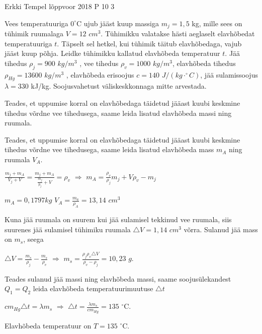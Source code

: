 {Erkki Tempel} %
{lõppvoor} %
{2018} %
{P 10} %
{3} %
{

\ifStatement
Vees temperatuuriga $0^{\circ}$C ujub jääst kuup massiga $m_j = 1,5$ kg, mille sees on tühimik ruumalaga $V = 12$ $cm^3$. Tühimikku valatakse hästi aeglaselt elavhõbedat temperatuuriga $t$. Täpselt sel hetkel, kui tühimik täitub elavhõbedaga, vajub jääst kuup põhja. Leidke tühimikku kallatud elavhõbeda temperatuur $t$. Jää tihedus $\rho_j = 900$ $kg/m^3$ , vee tihedus $\rho_v = 1000$ $kg/m^3$, elavhõbeda tihedus $\rho_{Hg} = 13 600$ $kg/m^3$ , elavhõbeda erisoojus $c = 140$ $J/(kg\cdot ^{\circ}C)$, jää sulamissoojus $\lambda = 330$ kJ/kg. Soojusvahetust väliskeskkonnaga mitte arvestada.
\fi

\ifHint
Teades, et uppumise korral on elavhõbedaga täidetud jääast kuubi keskmine tihedus võrdne vee tihedusega, saame leida lisatud elavhõbeda massi ning ruumala.
\fi

\ifSolution
Teades, et uppumise korral on elavhõbedaga täidetud jääast kuubi keskmine tihedus võrdne vee tihedusega, saame leida lisatud elavhõbeda mass $m_A$ ning ruumala $V_A$.
\begin{center}
$\frac{m_j + m_A}{V_j + V} = \frac{m_j + m_A}{\frac{m_j}{p_j} + V} = \rho_v$ $\Rightarrow$ $m_A = \frac{\rho_v}{\rho_j} m_j + V \rho_v - m_j$
\end{center}
\begin{center}
$m_A = 0,1797 kg$ 
$V_A = \frac{m_a}{\rho_A} = 13,14$ $cm^3$
\end{center}
Kuna jää ruumala on suurem kui jää sulamisel tekkinud vee ruumala, siis suurenes jää sulamisel tühimiku ruumala $\triangle V = 1,14$ $cm^3$ võrra. Sulanud jää mass on $m_s$, seega
\begin{center}
$\triangle V = \frac{m_s}{\rho_j} - \frac{m_s}{\rho_v}$ $\Rightarrow$ $m_s = \frac{\rho_j \rho_v \triangle V}{\rho_v - \rho_j} = 10,23$ $g$.
\end{center}
Teades sulanud jää massi ning elavhõbeda massi, saame soojusülekandest $Q_1 = Q_2$ leida elavhõbeda temperatuurimuutuse $\triangle t$
\begin{center}
$cm_{Hg} \triangle t = \lambda m_s$ $\Rightarrow$ $\triangle t = \frac{\lambda m_s}{cm_{Hg}} = 135$ $^{\circ}$C.
\end{center}
Elavhõbeda temperatuur on $T = 135$ $^{\circ}$C.
\fi
}